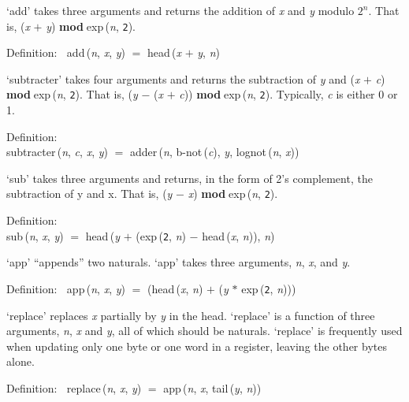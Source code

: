  `add' takes three arguments and returns the addition of {\it{x\/}} and {\it{y\/}} modulo
 $2^n$.  That is, ({\it{x\/}} $+$ {\it{y\/}}) ${}${\bf{mod}}${}$$\;${\rm{exp}}\,({\it{n\/}}, {\tt{2}}).
\begin{tabbing}{\sc Definition}:$\;\;$
{\rm{add}}\,({\it{n\/}}, {\it{x\/}}, {\it{y\/}}) $=$ {\rm{head}}\,({\it{x\/}} $+$ {\it{y\/}}, {\it{n\/}})
\end{tabbing}

 `subtracter' takes four arguments and returns the subtraction of {\it{y\/}} and
 ({\it{x\/}} $+$ {\it{c\/}}) ${}${\bf{mod}}${}$$\;${\rm{exp}}\,({\it{n\/}}, {\tt{2}}).  That is, ({\it{y\/}} $-$ ({\it{x\/}} $+$ {\it{c\/}})) ${}${\bf{mod}}${}$$\;${\rm{exp}}\,({\it{n\/}}, {\tt{2}}).  Typically,  {\it{c\/}} is
 either 0 or 1.
\begin{tabbing}{\sc Definition}: \\  
{\rm{subtracter}}\,({\it{n\/}}, {\it{c\/}}, {\it{x\/}}, {\it{y\/}}) $=$ {\rm{adder}}\,({\it{n\/}}, {\rm{b-not}}\,({\it{c\/}}), {\it{y\/}}, {\rm{lognot}}\,({\it{n\/}}, {\it{x\/}}))
\end{tabbing}

 `sub' takes three arguments and returns, in the form of 2's complement,
 the subtraction of y and x.  That is, ({\it{y\/}} $-$ {\it{x\/}}) ${}${\bf{mod}}${}$$\;${\rm{exp}}\,({\it{n\/}}, {\tt{2}}).
\begin{tabbing}{\sc Definition}: \\  
{\rm{sub}}\,({\it{n\/}}, {\it{x\/}}, {\it{y\/}}) $=$ {\rm{head}}\,({\it{y\/}} $+$ ({\rm{exp}}\,({\tt{2}}, {\it{n\/}}) $-$ {\rm{head}}\,({\it{x\/}}, {\it{n\/}})), {\it{n\/}})
\end{tabbing}

 `app' ``appends'' two naturals.  `app' takes three arguments, {\it{n\/}}, {\it{x\/}}, and {\it{y\/}}.
\begin{tabbing}{\sc Definition}:$\;\;$
{\rm{app}}\,({\it{n\/}}, {\it{x\/}}, {\it{y\/}}) $=$ ({\rm{head}}\,({\it{x\/}}, {\it{n\/}}) $+$ ({\it{y\/}} $*$ {\rm{exp}}\,({\tt{2}}, {\it{n\/}})))
\end{tabbing}

 `replace' replaces {\it{x\/}} partially by {\it{y\/}} in the head. `replace' is a function
 of three arguments, {\it{n\/}}, {\it{x\/}} and {\it{y\/}}, all of which should be naturals. `replace'
 is frequently used when updating only one byte or one word in a register,
 leaving the other bytes alone.
\begin{tabbing}{\sc Definition}:$\;\;$
{\rm{replace}}\,({\it{n\/}}, {\it{x\/}}, {\it{y\/}}) $=$ {\rm{app}}\,({\it{n\/}}, {\it{x\/}}, {\rm{tail}}\,({\it{y\/}}, {\it{n\/}}))
\end{tabbing}

